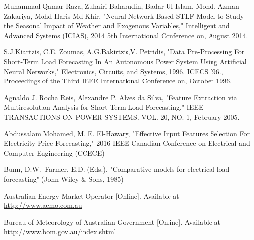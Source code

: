 \documentclass[runningheads,a4paper]{llncs}
\begin{document}
\begin{thebibliography}{4}
 Muhammad Qamar Raza, Zuhairi Baharudin, Badar-Ul-Islam, Mohd. Azman Zakariya, Mohd Haris Md Khir, "Neural Network Based STLF Model to Study the Seasonal Impact of Weather and Exogenous Variables," Intelligent and Advanced Systems (ICIAS), 2014 5th International Conference on, August 2014.

 S.J.Kiartzis, C.E. Zoumas, A.G.Bakirtzis,V. Petridis, "Data Pre-Processing For Short-Term Load Forecasting In An Autonomous Power System Using Artificial Neural Networks," Electronics, Circuits, and Systems, 1996. ICECS '96., Proceedings of the Third IEEE International Conference on, October 1996.

 Agnaldo J. Rocha Reis, Alexandre P. Alves da Silva, "Feature Extraction via Multiresolution Analysis for Short-Term Load Forecasting," IEEE TRANSACTIONS ON POWER SYSTEMS, VOL. 20, NO. 1, February 2005.

 Abdussalam Mohamed, M. E. El-Hawary, "Effective Input Features Selection For Electricity Price Forecasting," 2016 IEEE Canadian Conference on Electrical and Computer Engineering (CCECE)

 Bunn, D.W., Farmer, E.D. (Eds.), "Comparative models for electrical load forecasting" (John Wiley \& Sons, 1985)

 Australian Energy Market Operator [Online]. Available at \url{http://www.aemo.com.au}

 Bureau of Meteorology of Australian Government [Online]. Available at \url{http://www.bom.gov.au/index.shtml}

\end{thebibliography}
\end{document}
